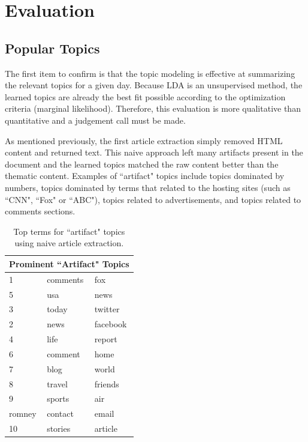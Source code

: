 \documentclass[10pt,twocolumn]{article}
\begin{document}
\section {Evaluation}

\subsection {Popular Topics}
The first item to confirm is that the topic modeling is effective at summarizing the relevant topics for a given day. Because LDA is an unsupervised method, the learned topics are already the best fit possible according to the optimization criteria (marginal likelihood).  Therefore, this evaluation is more qualitative than quantitative and a judgement call must be made.

As mentioned previously, the first article extraction simply removed HTML content and returned text.  This naive approach left many artifacts present in the document and the learned topics matched the raw content better than the thematic content.  Examples of ``artifact" topics include topics dominated by numbers, topics dominated by terms that related to the hosting sites (such as ``CNN", ``Fox" or ``ABC"), topics related to advertisements, and topics related to comments sections.  

\begin{table}
\begin{center}
\begin{tabular}{|l|l|l|}
  \hline
  \multicolumn{3}{|c|}{Prominent ``Artifact" Topics} \\
  \hline
 1 & comments & fox  \\
 5 & usa & news \\
 3 & today & twitter \\
2 & news & facebook  \\
4 & life & report  \\
6  & comment & home  \\
7 & blog & world  \\
8 & travel & friends \\
9 & sports & air \\
romney & contact & email \\
10 &  stories & article \\
\hline
\end{tabular}
\caption*{Top terms for ``artifact" topics using naive article extraction.}
\end{center}
\end{table}
\end{document}
